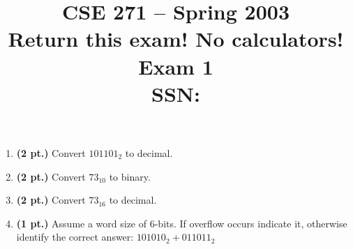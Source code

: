 \documentclass{article}
\begin{document}
\newcommand{\SOPmin}{${\rm SOP}_{\rm min} \ $}
\newcommand{\POSmin}{${\rm POS}_{\rm min} \ $}
\newcommand{\bs}{\backslash}


\title{
\Huge{CSE 271 -- Spring 2003}\\
\normalsize{Return this exam!  No calculators!}\\
\normalsize{Exam 1}\\
SSN:}
\date{}

\maketitle{}

\begin{enumerate}
\item {\bf (2 pt.)} Convert $101101_2$ to decimal.

\item {\bf (2 pt.)} Convert $73_{10}$ to binary.

\item {\bf (2 pt.)} Convert $73_{16}$ to decimal.
\pagebreak

\item {\bf (1 pt.)} Assume a word size of 6-bits.  If overflow occurs 
indicate it, otherwise identify the correct answer: $101010_2 + 011011_2$


\end{enumerate}
\end{document}
